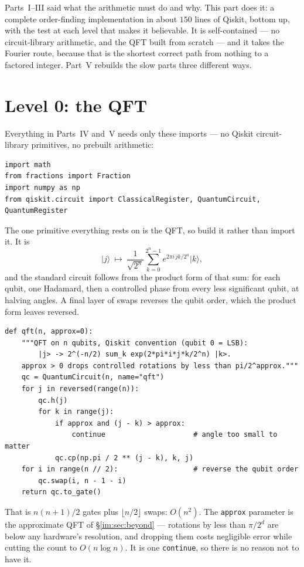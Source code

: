 \documentclass[11pt]{article}
\renewcommand{\ket}[1]{\lvert #1 \rangle}
\newcommand{\code}[1]{\texttt{#1}}
\theoremstyle{plain}
\theoremstyle{remark}
\begin{document}
\noindent
Parts~I--III said what the arithmetic must do and why. This part does it: a complete order-finding
implementation in about $150$ lines of Qiskit, bottom up, with the test at each level that makes it
believable. It is self-contained --- no circuit-library arithmetic, and the QFT built from scratch
--- and it takes the Fourier route, because that is the shortest correct path from nothing to a
factored integer. Part~V rebuilds the slow parts three different ways.

\section{Level 0: the QFT}\label{im:sec:l0}

Everything in Parts~IV and~V needs only these imports --- no Qiskit circuit-library
primitives, no prebuilt arithmetic:

\begin{lstlisting}
import math
from fractions import Fraction
import numpy as np
from qiskit.circuit import ClassicalRegister, QuantumCircuit, QuantumRegister
\end{lstlisting}

The one primitive everything rests on is the QFT, so build it rather than import it. It is
\[
\ket j\ \longmapsto\ \frac1{\sqrt{2^n}}\sum_{k=0}^{2^n-1}e^{2\pi i\,jk/2^n}\ket k,
\]
and the standard circuit follows from the product form of that sum: for each qubit, one Hadamard,
then a controlled phase from every less significant qubit, at halving angles. A final layer of
swaps reverses the qubit order, which the product form leaves reversed.

\begin{lstlisting}
def qft(n, approx=0):
    """QFT on n qubits, Qiskit convention (qubit 0 = LSB):
        |j> -> 2^(-n/2) sum_k exp(2*pi*i*j*k/2^n) |k>.
    approx > 0 drops controlled rotations by less than pi/2^approx."""
    qc = QuantumCircuit(n, name="qft")
    for j in reversed(range(n)):
        qc.h(j)
        for k in range(j):
            if approx and (j - k) > approx:
                continue                     # angle too small to matter
            qc.cp(np.pi / 2 ** (j - k), k, j)
    for i in range(n // 2):                  # reverse the qubit order
        qc.swap(i, n - 1 - i)
    return qc.to_gate()
\end{lstlisting}

That is $n(n{+}1)/2$ gates plus $\lfloor n/2\rfloor$ swaps: $O(n^2)$. The \code{approx} parameter
is the approximate QFT of \S\ref{im:sec:beyond} --- rotations by less than $\pi/2^{d}$ are below any
hardware's resolution, and dropping them costs negligible error while cutting the count to
$O(n\log n)$. It is one \code{continue}, so there is no reason not to have it.
\end{document}
